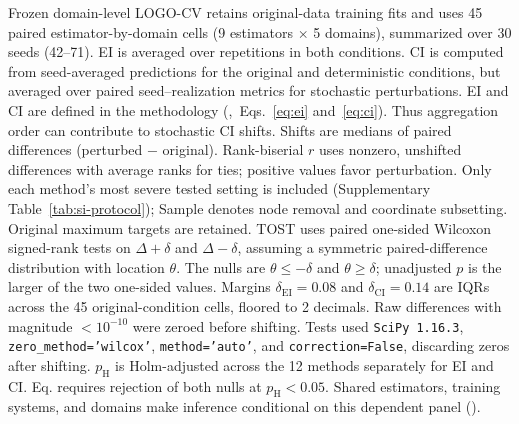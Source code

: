 \documentclass{article}
\begin{document}
\begin{table}[H]
\begin{minipage}{\linewidth}
Frozen domain-level LOGO-CV retains original-data training fits and uses 45 paired estimator-by-domain cells (9 estimators $\times$ 5 domains), summarized over 30 seeds (42--71). EI is averaged over repetitions in both conditions. CI is computed from seed-averaged predictions for the original and deterministic conditions, but averaged over paired seed--realization metrics for stochastic perturbations. EI and CI are defined in the methodology (,~Eqs.~\eqref{eq:ei} and~\eqref{eq:ci}). Thus aggregation order can contribute to stochastic CI shifts. Shifts are medians of paired differences (perturbed $-$ original). Rank-biserial $r$ uses nonzero, unshifted differences with average ranks for ties; positive values favor perturbation. Only each method's most severe tested setting is included (Supplementary Table~\ref{tab:si-protocol}); Sample denotes node removal and coordinate subsetting. Original maximum targets are retained. TOST uses paired one-sided Wilcoxon signed-rank tests on $\Delta+\delta$ and $\Delta-\delta$, assuming a symmetric paired-difference distribution with location $\theta$. The nulls are $\theta\leq-\delta$ and $\theta\geq\delta$; unadjusted $p$ is the larger of the two one-sided values. Margins $\delta_{\mathrm{EI}} = 0.08$ and $\delta_{\mathrm{CI}} = 0.14$ are IQRs across the 45 original-condition cells, floored to 2 decimals. Raw differences with magnitude $<10^{-10}$ were zeroed before shifting. Tests used \texttt{SciPy 1.16.3}, \texttt{zero\_method='wilcox'}, \texttt{method='auto'}, and \texttt{correction=False}, discarding zeros after shifting. $p_{\mathrm H}$ is Holm-adjusted across the 12 methods separately for EI and CI. Eq. requires rejection of both nulls at $p_{\mathrm H}<0.05$. Shared estimators, training systems, and domains make inference conditional on this dependent panel ().
\end{minipage}
\end{table}
\end{document}
